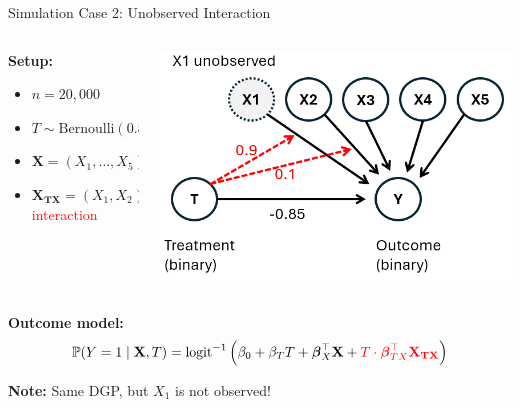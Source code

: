 \documentclass[onlytextwidth,english]{beamer}\usepackage[]{graphicx}\usepackage[]{xcolor}
\begin{document}
\begin{frame}{Simulation Case 2: Unobserved Interaction}

\begin{columns}

\begin{column}{0.52\textwidth}

\vspace{-0.5em}
\textbf{Setup:}
\begin{itemize}\setlength\itemsep{0.4em}
  \item $n = 20{,}000$
  \item $T \sim \text{Bernoulli}(0.5)$
  \item $\mathbf{X} = (X_1, \dots, X_5)^\top \sim \mathcal{N}(\mathbf{0}, \Sigma)$\\
  \item $\mathbf{X_{TX}} = (X_1, X_2)^\top$ \textcolor{red}{interaction}
\end{itemize}


\end{column}

\begin{column}{0.42\textwidth}
    \includegraphics[width=\textwidth]{img/simulation_unobserved.png}
\end{column}

\end{columns}


\vspace{0.3em}
\textbf{Outcome model:}
\[
\mathbb{P}(Y = 1 \mid \mathbf{X}, T) = \text{logit}^{-1} \left(
\beta_0 + \beta_T T + \boldsymbol{\beta}_X^\top \mathbf{X}
+ \textcolor{red}{T \cdot \boldsymbol{\beta}_{TX}^\top \mathbf{X_{TX}}}
\right)
\]

\textbf{Note:} Same DGP, but $X_1$ is not observed!

\end{frame}
\end{document}
